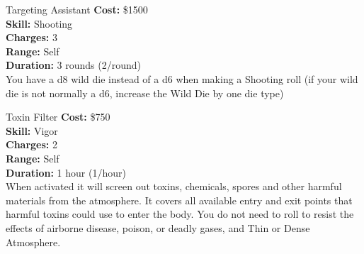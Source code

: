 \begin{multicols}{2}
\begin{genericsection}{Targeting Assistant}
\textbf{Cost:} \$1500\\
\textbf{Skill:} Shooting\\
\textbf{Charges:} 3\\
\textbf{Range:} Self\\
\textbf{Duration:} 3 rounds (2/round)\\
You have a d8 wild die instead of a d6 when making a Shooting roll (if your wild die is not normally a d6, increase the Wild Die by one die type)
\end{genericsection}

\begin{genericsection}{Toxin Filter}
\textbf{Cost:} \$750\\
\textbf{Skill:} Vigor\\
\textbf{Charges:} 2\\
\textbf{Range:} Self\\
\textbf{Duration:} 1 hour (1/hour)\\
When activated it will screen out toxins, chemicals, spores and other harmful materials from the atmosphere. It covers all available entry and exit points that harmful toxins could use to enter the body. You do not need to roll to resist the effects of airborne disease, poison, or deadly gases, and Thin or Dense Atmosphere.
\end{genericsection}

\end{multicols}
